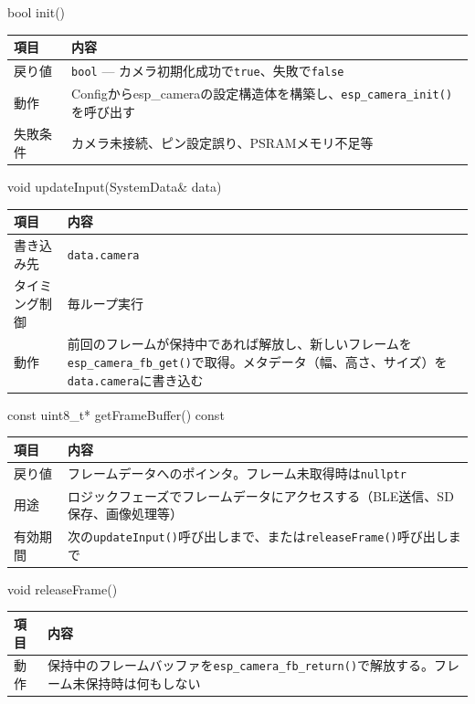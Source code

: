 \begin{funcblock}{bool init()}
\begin{tabularx}{\textwidth}{l X}
\toprule
\textbf{項目} & \textbf{内容} \\
\midrule
戻り値     & \texttt{bool} --- カメラ初期化成功で\texttt{true}、失敗で\texttt{false} \\
動作       & Configからesp\_cameraの設定構造体を構築し、\texttt{esp\_camera\_init()}を呼び出す \\
失敗条件   & カメラ未接続、ピン設定誤り、PSRAMメモリ不足等 \\
\bottomrule
\end{tabularx}
\end{funcblock}

\begin{funcblock}{void updateInput(SystemData\& data)}
\begin{tabularx}{\textwidth}{l X}
\toprule
\textbf{項目} & \textbf{内容} \\
\midrule
書き込み先     & \texttt{data.camera} \\
タイミング制御 & 毎ループ実行 \\
動作           & 前回のフレームが保持中であれば解放し、新しいフレームを\texttt{esp\_camera\_fb\_get()}で取得。メタデータ（幅、高さ、サイズ）を\texttt{data.camera}に書き込む \\
\bottomrule
\end{tabularx}
\end{funcblock}

\begin{funcblock}{const uint8\_t* getFrameBuffer() const}
\begin{tabularx}{\textwidth}{l X}
\toprule
\textbf{項目} & \textbf{内容} \\
\midrule
戻り値   & フレームデータへのポインタ。フレーム未取得時は\texttt{nullptr} \\
用途     & ロジックフェーズでフレームデータにアクセスする（BLE送信、SD保存、画像処理等） \\
有効期間 & 次の\texttt{updateInput()}呼び出しまで、または\texttt{releaseFrame()}呼び出しまで \\
\bottomrule
\end{tabularx}
\end{funcblock}

\begin{funcblock}{void releaseFrame()}
\begin{tabularx}{\textwidth}{l X}
\toprule
\textbf{項目} & \textbf{内容} \\
\midrule
動作   & 保持中のフレームバッファを\texttt{esp\_camera\_fb\_return()}で解放する。フレーム未保持時は何もしない \\
\bottomrule
\end{tabularx}
\end{funcblock}

